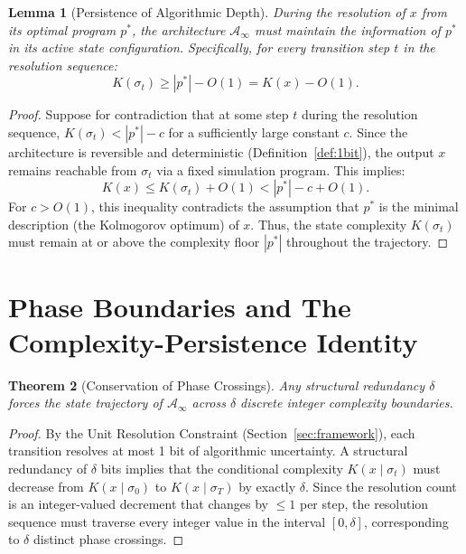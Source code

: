 \documentclass[12pt,a4paper]{article}
\theoremstyle{plain}
\newtheorem{theorem}{Theorem}[section]
\newtheorem{lemma}[theorem]{Lemma}
\theoremstyle{definition}
\begin{document}
\begin{lemma}[Persistence of Algorithmic Depth] \label{lem:persistence}
During the resolution of $x$ from its optimal program $p^*$, the architecture 
$\mathcal{A}_\infty$ must maintain the information of $p^*$ in its active state configuration. 
Specifically, for every transition step $t$ in the resolution sequence:
\begin{equation}
    K(\sigma_t) \ge |p^*| - O(1) = K(x) - O(1).
\end{equation}
\end{lemma}
\begin{proof}
Suppose for contradiction that at some step $t$ during the resolution sequence, $K(\sigma_t) < 
|p^*| - c$ for a sufficiently large constant $c$. Since the architecture is reversible and 
deterministic (Definition~\ref{def:1bit}), the output $x$ remains reachable from $\sigma_t$ 
via a fixed simulation program. This implies:
\begin{equation}
    K(x) \le K(\sigma_t) + O(1) < |p^*| - c + O(1).
\end{equation}
For $c > O(1)$, this inequality contradicts the assumption that $p^*$ is the minimal 
description (the Kolmogorov optimum) of $x$. Thus, the state complexity $K(\sigma_t)$ 
must remain at or above the complexity floor $|p^*|$ throughout the trajectory.
\end{proof}

\section{Phase Boundaries and The Complexity-Persistence Identity} \label{sec:master}

\begin{theorem}[Conservation of Phase Crossings] \label{thm:crossings}
Any structural redundancy $\delta$ forces the state trajectory of $\mathcal{A}_\infty$ across 
$\delta$ discrete integer complexity boundaries.
\end{theorem}
\begin{proof}
By the Unit Resolution Constraint (Section~\ref{sec:framework}), each transition resolves at 
most 1 bit of algorithmic uncertainty. A structural redundancy of $\delta$ bits implies that 
the conditional complexity $K(x \mid \sigma_t)$ must decrease from $K(x \mid \sigma_0)$ to 
$K(x \mid \sigma_T)$ by exactly $\delta$. Since the resolution count is an integer-valued 
decrement that changes by $\le 1$ per step, the resolution sequence must traverse every 
integer value in the interval $[0, \delta]$, corresponding to $\delta$ distinct phase 
crossings.
\end{proof}
\end{document}
